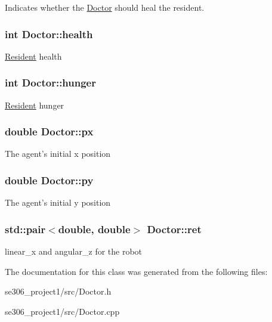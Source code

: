 Indicates whether the \hyperlink{classDoctor}{Doctor} should heal the resident. \hypertarget{classDoctor_ab1814310e306e7a742ffa9c5c6b913ef}{
\subsubsection[{health}]{\setlength{\rightskip}{0pt plus 5cm}int Doctor\-::health\hspace{0.3cm}{\ttfamily [protected]}}}\label{classDoctor_ab1814310e306e7a742ffa9c5c6b913ef}
\hyperlink{classResident}{Resident} health \hypertarget{classDoctor_a7b59e97eb09eed2ffed797d1174ac47f}{
\subsubsection[{hunger}]{\setlength{\rightskip}{0pt plus 5cm}int Doctor\-::hunger\hspace{0.3cm}{\ttfamily [protected]}}}\label{classDoctor_a7b59e97eb09eed2ffed797d1174ac47f}
\hyperlink{classResident}{Resident} hunger \hypertarget{classDoctor_a6ea729b1a8fc6d33176d768ef62b0a43}{
\subsubsection[{px}]{\setlength{\rightskip}{0pt plus 5cm}double Doctor\-::px\hspace{0.3cm}{\ttfamily [protected]}}}\label{classDoctor_a6ea729b1a8fc6d33176d768ef62b0a43}
The agent's initial x position \hypertarget{classDoctor_a04b4b5bddd2b99b6eb4b7b8813eeeebf}{
\subsubsection[{py}]{\setlength{\rightskip}{0pt plus 5cm}double Doctor\-::py\hspace{0.3cm}{\ttfamily [protected]}}}\label{classDoctor_a04b4b5bddd2b99b6eb4b7b8813eeeebf}
The agent's initial y position \hypertarget{classDoctor_ac371e75b4dcac584c9f2fa89585fefd7}{
\subsubsection[{ret}]{\setlength{\rightskip}{0pt plus 5cm}std\-::pair$<$double, double$>$ Doctor\-::ret\hspace{0.3cm}{\ttfamily [protected]}}}\label{classDoctor_ac371e75b4dcac584c9f2fa89585fefd7}
linear\-\_\-x and angular\-\_\-z for the robot 

The documentation for this class was generated from the following files\-:\begin{DoxyCompactItemize}
\item 
se306\-\_\-project1/src/Doctor.\-h\item 
se306\-\_\-project1/src/Doctor.\-cpp\end{DoxyCompactItemize}
